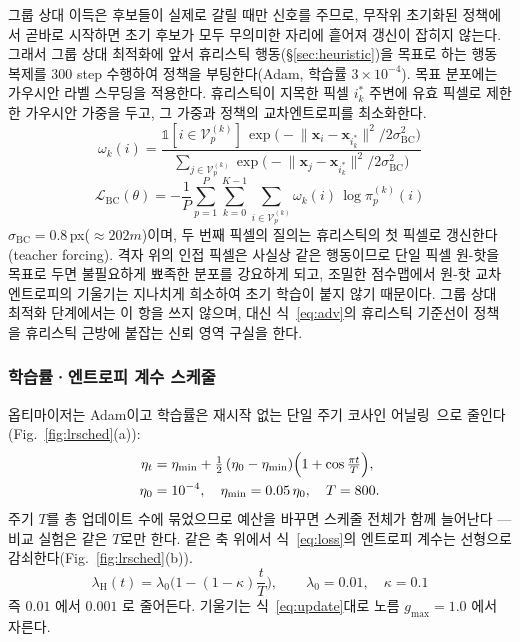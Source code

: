 그룹 상대 이득은 후보들이 실제로 갈릴 때만 신호를 주므로, 무작위 초기화된 정책에서 곧바로
시작하면 초기 후보가 모두 무의미한 자리에 흩어져 갱신이 잡히지 않는다. 그래서 그룹 상대
최적화에 앞서 휴리스틱 행동(\S\ref{sec:heuristic})을 목표로 하는 행동 복제를 300 step
수행하여 정책을 부팅한다(Adam, 학습률 $3\times10^{-4}$). 목표 분포에는 가우시안 라벨
스무딩을 적용한다. 휴리스틱이 지목한 픽셀 $i^{*}_k$ 주변에 유효 픽셀로 제한한 가우시안
가중을 두고, 그 가중과 정책의 교차엔트로피를 최소화한다.
\begin{equation}
\omega_k(i) = \frac{\mathbb{1}[i \in \mathcal{V}^{(k)}_p]\,
  \exp\!\big(-\lVert \mathbf{x}_i - \mathbf{x}_{i^{*}_k} \rVert^2 / 2\sigma_{\mathrm{BC}}^2\big)}
  {\sum_{j \in \mathcal{V}^{(k)}_p} \exp\!\big(-\lVert \mathbf{x}_j - \mathbf{x}_{i^{*}_k} \rVert^2 / 2\sigma_{\mathrm{BC}}^2\big)}
\label{eq:bcweight}
\end{equation}
\begin{equation}
\mathcal{L}_{\mathrm{BC}}(\theta) = -\frac{1}{P}\sum_{p=1}^{P} \sum_{k=0}^{K-1} \sum_{i \in \mathcal{V}^{(k)}_p}
  \omega_k(i)\, \log \pi^{(k)}_p(i)
\label{eq:lbc}
\end{equation}
$\sigma_{\mathrm{BC}} = 0.8$\,px($\approx 202\unit{m}$)이며, 두 번째 픽셀의 질의는 휴리스틱의
첫 픽셀로 갱신한다(teacher forcing). 격자 위의 인접 픽셀은 사실상 같은 행동이므로 단일
픽셀 원-핫을 목표로 두면 불필요하게 뾰족한 분포를 강요하게 되고, 조밀한 점수맵에서
원-핫 교차엔트로피의 기울기는 지나치게 희소하여 초기 학습이 붙지 않기 때문이다. 그룹 상대
최적화 단계에서는 이 항을 쓰지 않으며, 대신 식~\eqref{eq:adv}의 휴리스틱 기준선이 정책을
휴리스틱 근방에 붙잡는 신뢰 영역 구실을 한다.

\subsubsection{학습률·엔트로피 계수 스케줄}
\label{sec:schedule}

옵티마이저는 Adam이고 학습률은 재시작 없는 단일 주기 코사인
어닐링~\citep{loshchilov2017sgdr}으로 줄인다(Fig.~\ref{fig:lrsched}(a)):
\begin{equation}
\begin{aligned}
\eta_t &= \eta_{\min} + \tfrac{1}{2}\,(\eta_0 - \eta_{\min})
          \Bigl(1 + \cos\tfrac{\pi t}{T}\Bigr),\\
\eta_0 &= 10^{-4},\quad \eta_{\min} = 0.05\,\eta_0,\quad T = 800 .
\end{aligned}
\label{eq:cosine}
\end{equation}
주기 $T$를 총 업데이트 수에 묶었으므로 예산을 바꾸면 스케줄 전체가 함께 늘어난다 --- 비교
실험은 같은 $T$로만 한다. 같은 축 위에서 식~\eqref{eq:loss}의 엔트로피 계수는 선형으로
감쇠한다(Fig.~\ref{fig:lrsched}(b)).
\begin{equation}
\lambda_{\mathrm{H}}(t) = \lambda_0 \Big(1 - (1 - \kappa)\frac{t}{T}\Big), \qquad
\lambda_0 = 0.01,\quad \kappa = 0.1
\label{eq:entsched}
\end{equation}
즉 $0.01$ 에서 $0.001$ 로 줄어든다. 기울기는 식~\eqref{eq:update}대로 노름 $g_{\max} = 1.0$ 에서
자른다.

